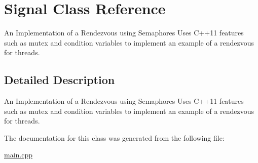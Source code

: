 \hypertarget{class_signal}{}\section{Signal Class Reference}
\label{class_signal}


An Implementation of a Rendezvous using Semaphores Uses C++11 features such as mutex and condition variables to implement an example of a rendezvous for threads.  




\subsection{Detailed Description}
An Implementation of a Rendezvous using Semaphores Uses C++11 features such as mutex and condition variables to implement an example of a rendezvous for threads. 

The documentation for this class was generated from the following file\+:\begin{DoxyCompactItemize}
\item 
\hyperlink{main_8cpp}{main.\+cpp}\end{DoxyCompactItemize}
